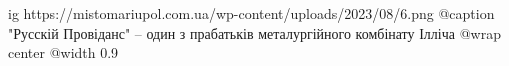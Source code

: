  
 
 
 
 

\ifcmt
  ig https://mistomariupol.com.ua/wp-content/uploads/2023/08/6.png
	@caption "Русскій Провіданс" – один з прабатьків металургійного комбінату Ілліча
  @wrap center
  @width 0.9
\fi
